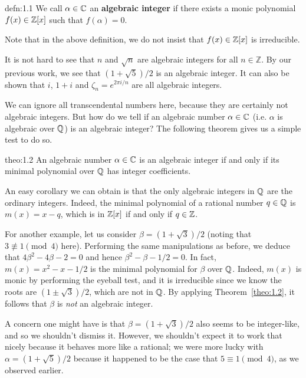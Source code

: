 \begin{defn}{defn:1.1}
    We call $\alpha \in \mathbb{C}$ an {\bf algebraic integer} if there 
    exists a monic polynomial $f(x) \in \mathbb{Z}[x]$ such that $f(\alpha) = 0$. 
\end{defn}

Note that in the above definition, we do not insist that $f(x) \in \mathbb{Z}[x]$ 
is irreducible.

It is not hard to see that $n$ and $\sqrt{n}$ are algebraic integers for 
all $n \in \mathbb{Z}$. By our previous work, we see that $(1 + \sqrt{5})/2$ 
is an algebraic integer. It can also be shown that $i$, $1 + i$ and 
$\zeta_n = e^{2\pi i/n}$ are all algebraic integers.

We can ignore all transcendental numbers here, because they are certainly 
not algebraic integers. But how do we tell if an algebraic number $\alpha \in \mathbb{C}$ 
(i.e. $\alpha$ is algebraic over $\mathbb{Q}$) is an algebraic integer? The following 
theorem gives us a simple test to do so.

\begin{theo}{theo:1.2}
    An algebraic number $\alpha \in \mathbb{C}$ is an algebraic integer if and only if 
    its minimal polynomial over $\mathbb{Q}$ has integer coefficients.
\end{theo}

An easy corollary we can obtain is that the only algebraic integers 
in $\mathbb{Q}$ are the ordinary integers. Indeed, the minimal polynomial of 
a rational number $q \in \mathbb{Q}$ is $m(x) = x - q$, which is in $\mathbb{Z}[x]$ 
if and only if $q \in \mathbb{Z}$. 

For another example, let us consider $\beta = (1 + \sqrt{3})/2$ (noting that 
$3 \not\equiv 1 \pmod 4$ here). Performing the same manipulations as before, 
we deduce that $4\beta^2 - 4\beta - 2 = 0$ and hence $\beta^2 - \beta - 1/2 = 0$. 
In fact, $m(x) = x^2 - x - 1/2$ is the minimal polynomial for $\beta$ over 
$\mathbb{Q}$. Indeed, $m(x)$ is monic by performing the eyeball test, and it is 
irreducible since we know the roots are $(1 \pm \sqrt{3})/2$, which are 
not in $\mathbb{Q}$. By applying Theorem~\ref{theo:1.2}, it follows that $\beta$ is 
\emph{not} an algebraic integer. 

A concern one might have is that $\beta = (1 + \sqrt{3})/2$ also seems to be 
integer-like, and so we shouldn't dismiss it. However, we shouldn't expect 
it to work that nicely because it behaves more like a rational; we were 
more lucky with $\alpha = (1 + \sqrt{5})/2$ because it happened to be the 
case that $5 \equiv 1 \pmod 4$, as we observed earlier.


